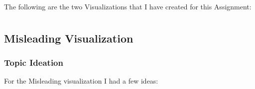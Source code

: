 \documentclass{article}
\begin{document}
The following are the two Visualizations that I have created for this Assignment:



\section{}
\label{sec:sec2}

\subsection{Misleading Visualization}
\label{subsec:misleading}

\subsubsection{Topic Ideation}

For the Misleading visualization I had a few ideas:
\end{document}
